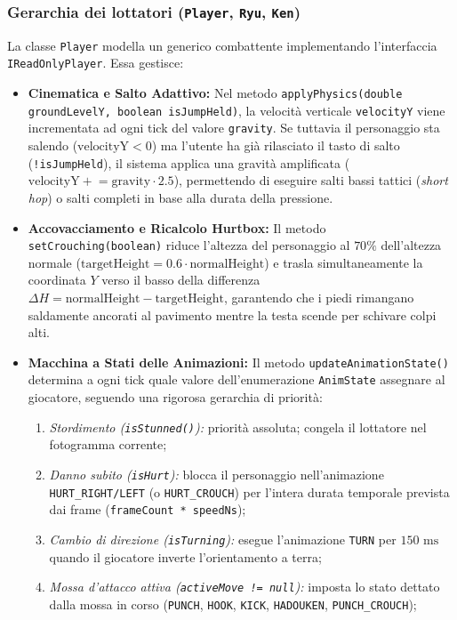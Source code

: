 \documentclass[11pt, a4paper]{article}
\begin{document}
	\subsubsection{Gerarchia dei lottatori (\texttt{Player}, \texttt{Ryu}, \texttt{Ken})}
	La classe \texttt{Player} modella un generico combattente implementando l'interfaccia \texttt{IReadOnlyPlayer}. Essa gestisce:
	\begin{itemize}
		\item \textbf{Cinematica e Salto Adattivo:} Nel metodo \texttt{applyPhysics(double groundLevelY, boolean isJumpHeld)}, la velocità verticale \texttt{velocityY} viene incrementata ad ogni tick del valore \texttt{gravity}. Se tuttavia il personaggio sta salendo ($\text{velocityY} < 0$) ma l'utente ha già rilasciato il tasto di salto (\texttt{!isJumpHeld}), il sistema applica una gravità amplificata ($\text{velocityY} \mathrel{+}= \text{gravity} \cdot 2.5$), permettendo di eseguire salti bassi tattici (\emph{short hop}) o salti completi in base alla durata della pressione.
		\item \textbf{Accovacciamento e Ricalcolo Hurtbox:} Il metodo \texttt{setCrouching(boolean)} riduce l'altezza del personaggio al $70\%$ dell'altezza normale ($\text{targetHeight} = 0.6 \cdot \text{normalHeight}$) e trasla simultaneamente la coordinata $Y$ verso il basso della differenza $\Delta H = \text{normalHeight} - \text{targetHeight}$, garantendo che i piedi rimangano saldamente ancorati al pavimento mentre la testa scende per schivare colpi alti.
		\item \textbf{Macchina a Stati delle Animazioni:} Il metodo \texttt{updateAnimationState()} determina a ogni tick quale valore dell'enumerazione \texttt{AnimState} assegnare al giocatore, seguendo una rigorosa gerarchia di priorità:
		\begin{enumerate}
			\item \emph{Stordimento (\texttt{isStunned()}):} priorità assoluta; congela il lottatore nel fotogramma corrente;
			\item \emph{Danno subito (\texttt{isHurt}):} blocca il personaggio nell'animazione \texttt{HURT\_RIGHT/LEFT} (o \texttt{HURT\_CROUCH}) per l'intera durata temporale prevista dai frame (\texttt{frameCount * speedNs});
			\item \emph{Cambio di direzione (\texttt{isTurning}):} esegue l'animazione \texttt{TURN} per $150\text{ ms}$ quando il giocatore inverte l'orientamento a terra;
			\item \emph{Mossa d'attacco attiva (\texttt{activeMove != null}):} imposta lo stato dettato dalla mossa in corso (\texttt{PUNCH}, \texttt{HOOK}, \texttt{KICK}, \texttt{HADOUKEN}, \texttt{PUNCH\_CROUCH});

\end{enumerate}
\end{itemize}
\end{document}
